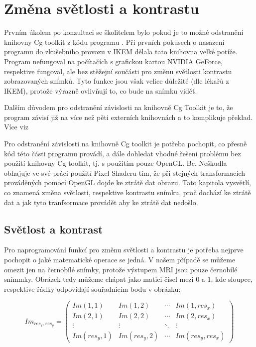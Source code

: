 \section{Změna světlosti a kontrastu}
Prvním úkolem po konzultaci se školitelem bylo pokud je to možné odstranění knihovny Cg toolkit z kódu programu \cite[str. 23]{flaska}. Při prvních pokusech o nasazení programu do zkušebního provozu v IKEM dělala tato knihovna velké potíže. Program nefungoval na počítačích s grafickou kartou NVIDIA GeForce, respektive fungoval, ale bez stěžejní součásti pro změnu světlosti  kontrastu zobrazovaných snímků. Tyto funkce jsou však velice důležité (dle lékařů z IKEM), protože výrazně ovlivňují to, co bude na snímku vidět.

Dalším důvodem pro odstranění závislosti na knihovně Cg Toolkit je to, že program závisí již na více než pěti externích knihovnách a to komplikuje překlad. Více viz~\pageref{sec:preklad} 

Pro odstranění závislosti na knihovně Cg toolkit je potřeba pochopit, co přesně kód této části programu provádí, a dále dohledat vhodné řešení problému bez použití knihovny Cg toolkit, tj. s použitím pouze OpenGL. Bc. Neškudla obhajuje ve své práci použití Pixel Shaderu tím, že při stejných transformacích prováděných pomocí OpenGL dojde ke ztrátě dat obrazu. Tato kapitola vysvětlí, co znamená změna světlosti, respektive kontrastu snímku, proč dochází ke ztrátě dat a jak tyto tranfsormace provádět aby ke ztrátě dat nedošlo.

\subsection{Světlost a kontrast}
Pro naprogramování funkcí pro změnu světlosti a kontrastu je potřeba nejprve pochopit o jaké matematické operace se jedná. V našem případě se můžeme omezit jen na černobílé snímky, protože výstupem MRI jsou pouze černobílé snímmky. Obrázek tedy můžeme chápat jako matici čísel mezi $0$ a $1$, kde sloupce, respektive řádky odpovídají souřadnicím bodu v obrázku:

\[
 Im_{res_{x},res_{y}} =
 \begin{pmatrix}
  Im(1,1) & Im(1,2) & \cdots & Im(1,res_{x}) \\
  Im(2,1) & Im(2,2) & \cdots & Im(2,res_{x}) \\
  \vdots  & \vdots  & \ddots & \vdots  \\
  Im(res_{y},1) & Im(res_{y},2) & \cdots & Im(res_{y},res_{x})
 \end{pmatrix}
\]

